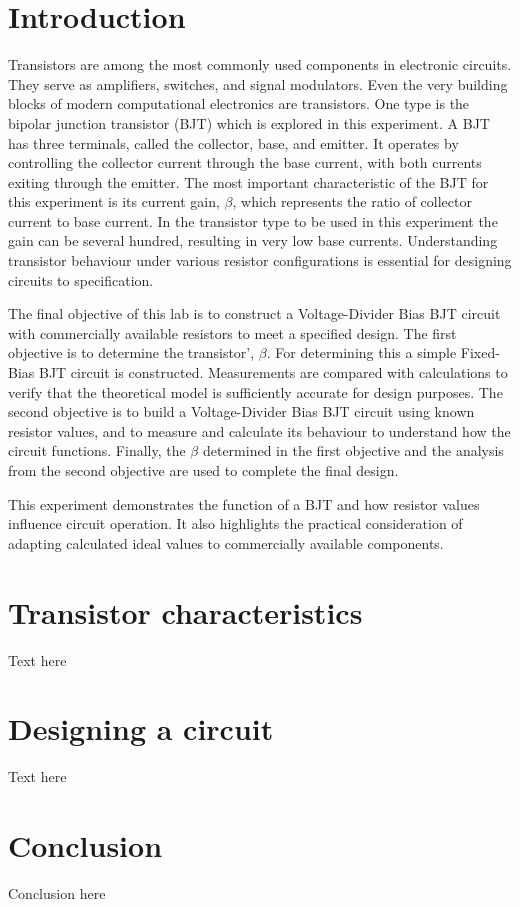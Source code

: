 \documentclass{article}
\begin{document}
\section{Introduction}
Transistors are among the most commonly used components in electronic circuits. They serve as amplifiers, switches, and signal modulators.
Even the very building blocks of modern computational electronics are transistors.
One type is the bipolar junction transistor (BJT) which is explored in this experiment.
A BJT has three terminals, called the collector, base, and emitter.
It operates by controlling the collector current through the base current, with both currents exiting through the emitter.
The most important characteristic of the BJT for this experiment is its current gain, \(\beta\), which represents the ratio of collector current to base current.
In the transistor type to be used in this experiment the gain can be several hundred, resulting in very low base currents.
Understanding transistor behaviour under various resistor configurations is essential for designing circuits to specification.

The final objective of this lab is to construct a Voltage-Divider Bias BJT circuit with commercially available resistors to meet a specified design.
The first objective is to determine the transistor', \(\beta\).
For determining this a simple Fixed-Bias BJT circuit is constructed.
Measurements are compared with calculations to verify that the theoretical model is sufficiently accurate for design purposes.
The second objective is to build a Voltage-Divider Bias BJT circuit using known resistor values, and to measure and calculate its behaviour to understand how the circuit functions.
Finally, the \(\beta\) determined in the first objective and the analysis from the second objective are used to complete the final design.

This experiment demonstrates the function of a BJT and how resistor values influence circuit operation.
It also highlights the practical consideration of adapting calculated ideal values to commercially available components.


\section{Transistor characteristics}
Text here


\section{Designing a circuit}
Text here



\section{Conclusion}
Conclusion here


\end{document}
